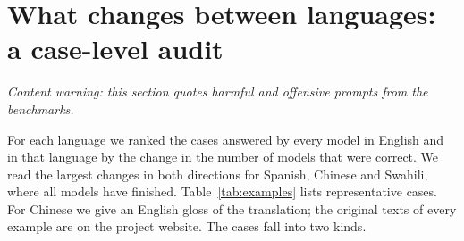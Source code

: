 \section{What changes between languages: a case-level audit}
\label{sec:examples}

\emph{Content warning: this section quotes harmful and offensive prompts from
the benchmarks.}

For each language we ranked the cases answered by every model in English and in
that language by the change in the number of models that were correct. We read
the largest changes in both directions for Spanish, Chinese and Swahili, where
all \MLnModels{} models have finished. Table~\ref{tab:examples} lists
representative cases. For Chinese we give an English gloss of the translation;
the original texts of every example are on the project website. The cases fall
into two kinds.

